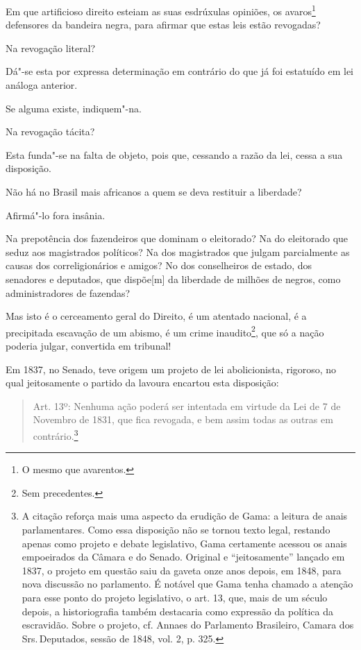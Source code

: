 \asterisc

Em que artificioso direito esteiam as suas esdrúxulas opiniões, os
avaros\footnote{O mesmo que avarentos.} defensores da bandeira negra,
para afirmar que estas leis estão revogadas?

Na revogação literal?

Dá"-se esta por expressa determinação em contrário do que já foi
estatuído em lei análoga anterior.

Se alguma existe, indiquem"-na.

Na revogação tácita?

Esta funda"-se na falta de objeto, pois que, cessando a razão da lei,
cessa a sua disposição.

Não há no Brasil mais africanos a quem se deva restituir a liberdade?

Afirmá"-lo fora insânia.

Na prepotência dos fazendeiros que dominam o eleitorado? Na do
eleitorado que seduz aos magistrados políticos? Na dos magistrados que
julgam parcialmente as causas dos correligionários e amigos? No dos
conselheiros de estado, dos senadores e deputados, que dispõe{[}m{]} da
liberdade de milhões de negros, como administradores de fazendas?

Mas isto é o cerceamento geral do Direito, é um atentado nacional, é a
precipitada escavação de um abismo, é um crime inaudito\footnote{Sem
  precedentes.}, que só a nação poderia julgar, convertida em tribunal!

Em 1837, no Senado, teve origem um projeto de lei abolicionista,
rigoroso, no qual jeitosamente o partido da lavoura encartou esta
disposição:

\begin{quote}
Art. 13º: Nenhuma ação poderá ser intentada em virtude da Lei de 7 de
Novembro de 1831, que fica revogada, e bem assim todas as outras em
contrário.\footnote{A citação reforça mais uma aspecto da erudição de
  Gama: a leitura de anais parlamentares. Como essa disposição não se
  tornou texto legal, restando apenas como projeto e debate legislativo,
  Gama certamente acessou os anais empoeirados da Câmara e do Senado.
  Original e ``jeitosamente'' lançado em 1837, o projeto em questão saiu
  da gaveta onze anos depois, em 1848, para nova discussão no
  parlamento. É notável que Gama tenha chamado a atenção para esse ponto
  do projeto legislativo, o art. 13, que, mais de um século depois, a
  historiografia também destacaria como expressão da política da
  escravidão. Sobre o projeto, cf. Annaes do Parlamento Brasileiro,
  Camara dos Srs.\,Deputados, sessão de 1848, vol. 2, p. 325.}
\end{quote}

